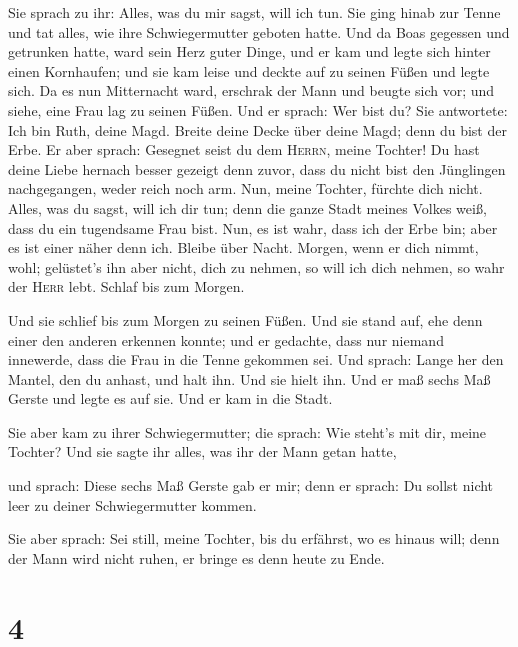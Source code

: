  Sie sprach zu ihr: Alles, was du mir sagst, will ich tun.
 Sie ging hinab zur Tenne und tat alles, wie ihre
Schwiegermutter geboten hatte.  Und da Boas gegessen und
getrunken hatte, ward sein Herz guter Dinge, und er kam und legte sich
hinter einen Kornhaufen; und sie kam leise und deckte auf zu seinen
Füßen und legte sich.  Da es nun Mitternacht ward,
erschrak der Mann und beugte sich vor; und siehe, eine Frau lag zu
seinen Füßen.  Und er sprach: Wer bist du? Sie antwortete:
Ich bin Ruth, deine Magd. Breite deine Decke über deine Magd; denn du
bist der Erbe.  Er aber sprach: Gesegnet seist du dem
\textsc{Herrn}, meine Tochter! Du hast deine Liebe hernach besser
gezeigt denn zuvor, dass du nicht bist den Jünglingen nachgegangen,
weder reich noch arm.  Nun, meine Tochter, fürchte dich
nicht. Alles, was du sagst, will ich dir tun; denn die ganze Stadt
meines Volkes weiß, dass du ein tugendsame Frau bist. 
Nun, es ist wahr, dass ich der Erbe bin; aber es ist einer näher denn
ich.  Bleibe über Nacht. Morgen, wenn er dich nimmt,
wohl; gelüstet's ihn aber nicht, dich zu nehmen, so will ich dich
nehmen, so wahr der \textsc{Herr} lebt. Schlaf bis zum Morgen.

 Und sie schlief bis zum Morgen zu seinen Füßen. Und sie
stand auf, ehe denn einer den anderen erkennen konnte; und er gedachte,
dass nur niemand innewerde, dass die Frau in die Tenne gekommen sei.
 Und sprach: Lange her den Mantel, den du anhast, und
halt ihn. Und sie hielt ihn. Und er maß sechs Maß Gerste und legte es
auf sie. Und er kam in die Stadt.

 Sie aber kam zu ihrer Schwiegermutter; die sprach: Wie
steht's mit dir, meine Tochter? Und sie sagte ihr alles, was ihr der
Mann getan hatte,

 und sprach: Diese sechs Maß Gerste gab er mir; denn er
sprach: Du sollst nicht leer zu deiner Schwiegermutter kommen.

 Sie aber sprach: Sei still, meine Tochter, bis du
erfährst, wo es hinaus will; denn der Mann wird nicht ruhen, er bringe
es denn heute zu Ende.

\hypertarget{section-3}{%
\section{4}\label{section-3}}

